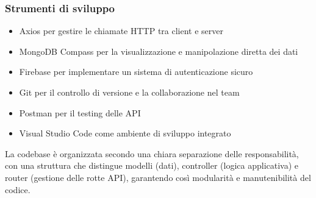 \subsubsection*{Strumenti di sviluppo}
    \begin{itemize}
    \item Axios per gestire le chiamate HTTP tra client e server
    \item MongoDB Compass per la visualizzazione e manipolazione diretta dei dati
    \item Firebase per implementare un sistema di autenticazione sicuro
    \item Git per il controllo di versione e la collaborazione nel team
    \item Postman per il testing delle API
    \item Visual Studio Code come ambiente di sviluppo integrato
    \end{itemize}
La codebase è organizzata secondo una chiara separazione delle responsabilità, con una struttura che distingue modelli (dati), controller (logica applicativa) e router (gestione delle rotte API), garantendo così modularità e manutenibilità del codice.


